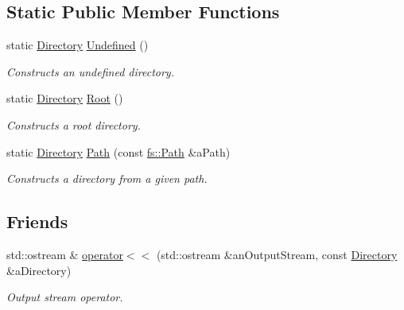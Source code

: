 \subsection*{Static Public Member Functions}
\begin{DoxyCompactItemize}
\item 
static \mbox{\hyperlink{classlibrary_1_1core_1_1fs_1_1_directory}{Directory}} \mbox{\hyperlink{classlibrary_1_1core_1_1fs_1_1_directory_a448eafac782d46d3e7764aaf6d9beed0}{Undefined}} ()
\begin{DoxyCompactList}\small\item\em Constructs an undefined directory. \end{DoxyCompactList}\item 
static \mbox{\hyperlink{classlibrary_1_1core_1_1fs_1_1_directory}{Directory}} \mbox{\hyperlink{classlibrary_1_1core_1_1fs_1_1_directory_a617eb0d4858dd8e2b69a6c5e7b645d8c}{Root}} ()
\begin{DoxyCompactList}\small\item\em Constructs a root directory. \end{DoxyCompactList}\item 
static \mbox{\hyperlink{classlibrary_1_1core_1_1fs_1_1_directory}{Directory}} \mbox{\hyperlink{classlibrary_1_1core_1_1fs_1_1_directory_ae906e33e4659219cf296dd314c7726b8}{Path}} (const \mbox{\hyperlink{classlibrary_1_1core_1_1fs_1_1_path}{fs\+::\+Path}} \&a\+Path)
\begin{DoxyCompactList}\small\item\em Constructs a directory from a given path. \end{DoxyCompactList}\end{DoxyCompactItemize}
\subsection*{Friends}
\begin{DoxyCompactItemize}
\item 
std\+::ostream \& \mbox{\hyperlink{classlibrary_1_1core_1_1fs_1_1_directory_a3cbfede39f82ab145f110ca14e21deef}{operator$<$$<$}} (std\+::ostream \&an\+Output\+Stream, const \mbox{\hyperlink{classlibrary_1_1core_1_1fs_1_1_directory}{Directory}} \&a\+Directory)
\begin{DoxyCompactList}\small\item\em Output stream operator. \end{DoxyCompactList}\end{DoxyCompactItemize}


